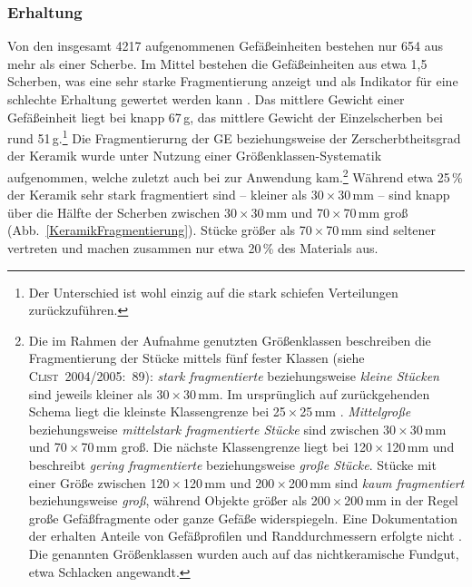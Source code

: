 \begin{multicols}{2}
\subsubsection{Erhaltung}

Von den insgesamt 4217 aufgenommenen Gefäßeinheiten bestehen nur 654 aus mehr als einer Scherbe. Im Mittel bestehen die Gefäßeinheiten aus etwa 1,5 Scherben, was eine sehr starke Fragmentierung anzeigt und als Indikator für eine schlechte Erhaltung gewertet werden kann \parencite[siehe][86]{Jesse.2003}. Das mittlere Gewicht einer Gefäßeinheit liegt bei knapp 67\,g, das mittlere Gewicht der Einzelscherben bei rund 51\,g.\footnote{Der Unterschied ist wohl einzig auf die stark schiefen Verteilungen zurückzuführen.} Die Fragmentierurng der GE beziehungsweise der Zerscherbtheitsgrad der Keramik wurde unter Nutzung einer Größenklassen-Systematik aufgenommen, welche zuletzt auch bei \textcite[89]{Clist.20042005} zur Anwendung kam.\footnote{Die im Rahmen der Aufnahme genutzten Größenklassen beschreiben die Fragmentierung der Stücke mittels fünf fester Klassen (siehe \textsc{Clist}~2004/2005:~89): \textit{stark fragmentierte} beziehungsweise \textit{kleine Stücken} sind jeweils kleiner als 30\,$\times$\,30\,mm. Im ursprünglich auf \textcite[379]{Joukowsky.1980} zurückgehenden Schema liegt die kleinste Klassengrenze bei 25\,$\times$\,25\,mm \parencites[nach][]{Claes.1985}{deMaret.1985}[89]{Clist.20042005}. \textit{Mittelgroße} beziehungsweise \textit{mittelstark fragmentierte Stücke} sind zwischen  30\,$\times$\,30\,mm und 70\,$\times$\,70\,mm groß. Die nächste Klassengrenze liegt bei 120\,$\times$\,120\,mm und beschreibt \textit{gering fragmentierte} beziehungsweise \textit{große Stücke}. Stücke mit einer Größe zwischen 120\,$\times$\,120\,mm und 200\,$\times$\,200\,mm sind \textit{kaum fragmentiert} beziehungsweise \textit{groß}, während Objekte größer als 200\,$\times$\,200\,mm in der Regel große Gefäßfragmente oder ganze Gefäße widerspiegeln. Eine Dokumentation der erhalten Anteile von Gefäßprofilen und Randdurchmessern erfolgte nicht \parencite[siehe hierzu][155\,f.]{Claen.2011}. Die genannten Größenklassen wurden auch auf das nichtkeramische Fundgut, etwa Schlacken angewandt.\label{ftn:Keramik_Fragmentierung}} Während etwa 25\,\% der Keramik sehr stark fragmentiert sind -- kleiner als 30\,$\times$\,30\,mm -- sind knapp über die Hälfte der Scherben zwischen 30\,$\times$\,30\,mm und 70\,$\times$\,70\,mm groß (Abb.~\ref{KeramikFragmentierung}). Stücke größer als 70\,$\times$\,70\,mm sind seltener vertreten und machen zusammen nur etwa 20\,\% des Materials aus.



\end{multicols}
